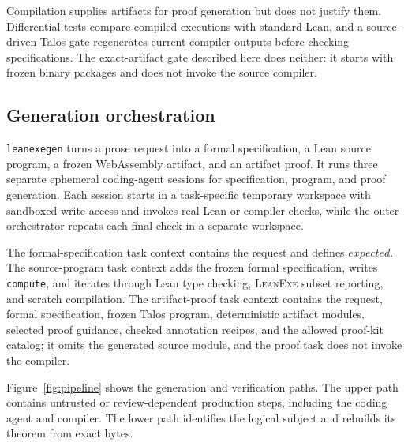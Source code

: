 \documentclass[11pt]{article}
\newcommand{\leanexe}{\textsc{LeanExe}}
\newcommand{\leanexegen}{\texttt{leanexegen}}
\newcommand{\code}[1]{\texttt{#1}}
\begin{document}
Compilation supplies artifacts for proof generation but does not justify them.  Differential tests compare compiled executions with standard Lean, and a source-driven Talos gate regenerates current compiler outputs before checking specifications.  The exact-artifact gate described here does neither: it starts with frozen binary packages and does not invoke the source compiler.

\subsection{Generation orchestration}

\leanexegen{} turns a prose request into a formal specification, a Lean source program, a frozen WebAssembly artifact, and an artifact proof.  It runs three separate ephemeral coding-agent sessions for specification, program, and proof generation.  Each session starts in a task-specific temporary workspace with sandboxed write access and invokes real Lean or compiler checks, while the outer orchestrator repeats each final check in a separate workspace.

The formal-specification task context contains the request and defines $\mathit{expected}$.  The source-program task context adds the frozen formal specification, writes \code{compute}, and iterates through Lean type checking, \leanexe{} subset reporting, and scratch compilation.  The artifact-proof task context contains the request, formal specification, frozen Talos program, deterministic artifact modules, selected proof guidance, checked annotation recipes, and the allowed proof-kit catalog; it omits the generated source module, and the proof task does not invoke the compiler.

Figure~\ref{fig:pipeline} shows the generation and verification paths.  The upper path contains untrusted or review-dependent production steps, including the coding agent and compiler.  The lower path identifies the logical subject and rebuilds its theorem from exact bytes.
\end{document}
